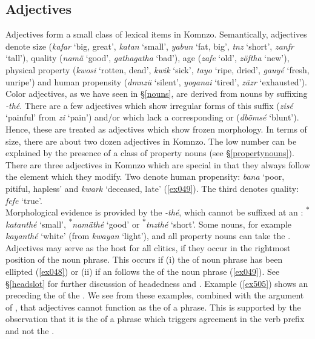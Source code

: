 \subsection{Adjectives} \label{adjectives}

Adjectives form a small class of lexical items in Komnzo. Semantically, adjectives denote size (\emph{kafar} `big, great', \emph{katan} `small', \emph{yabun} `fat, big', \emph{tnz} `short', \emph{zanfr} `tall'), quality (\emph{namä} `good', \emph{gathagatha} `bad'), age (\emph{zafe} `old', \emph{zöftha} `new'), physical property (\emph{kwosi} `rotten, dead', \emph{kwik} `sick', \emph{tayo} `ripe, dried', \emph{gauyé} `fresh, unripe') and human propensity (\emph{dmnzü} `silent', \emph{yoganai} `tired', \emph{zäzr} `exhausted'). Color adjectives, as we have seen in \S{}\ref{nouns}, are derived from nouns by suffixing \emph{-thé}. There are a few adjectives which show irregular forms of this suffix (\emph{zisé} `painful' from \emph{zi} `pain') and/or which lack a corresponding  or  (\emph{dbömsé} `blunt'). Hence, these are treated as adjectives which show frozen morphology. In terms of size, there are about two dozen adjectives in Komnzo. The low number can be explained by the presence of a class of property nouns (see \S{}\ref{propertynouns}).\\

There are three adjectives in Komnzo which are special in that they always follow the element which they modify. Two denote human propensity: \emph{bana} `poor, pitiful, hapless' and \emph{kwark} `deceased, late' (\ref{ex049}). The third denotes quality: \emph{fefe} `true'.\\

Morphological evidence is provided by the  \emph{-thé}, which cannot be suffixed at an : \textsuperscript{$\ast$}\emph{katanthé} `small', \textsuperscript{$\ast$}\emph{namäthé} `good' or \textsuperscript{$\ast$}\emph{tnzthé} `short'. Some nouns, for example \emph{kayanthé} `white' (from \emph{kwayan} `light'), and all property nouns can take the .\\

Adjectives may serve as the host for all  clitics, if they occur in the rightmost position of the noun phrase. This occurs if (i) the  of noun phrase has been ellipted (\ref{ex048}) or (ii) if an  follows the  of the noun phrase (\ref{ex049}). See \S{}\ref{headslot} for further discussion of headedness and . Example (\ref{ex505}) shows an  preceding the  of the . We see from these examples, combined with the argument of , that adjectives cannot function as the  of a phrase. This is supported by the observation that it is the  of a phrase which triggers agreement in the verb prefix and not the .

